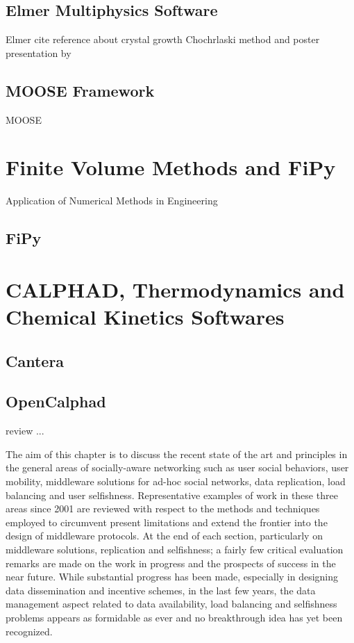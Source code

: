 \subsection{Elmer Multiphysics Software}
Elmer cite reference about crystal growth Chochrlaski method \cite{VSavolainen2002} and poster presentation by 
\cite{PRaback2007}
\subsection{MOOSE Framework}
MOOSE 
\section{Finite Volume Methods and FiPy} 
Application of Numerical Methods in Engineering
\subsection{FiPy}

\section{CALPHAD, Thermodynamics and Chemical Kinetics Softwares}
\subsection{Cantera}
\subsection{OpenCalphad}

review
...

The aim of this chapter is to discuss the recent state of the art and principles in the general areas of socially-aware networking such as user social behaviors, user mobility, middleware solutions for ad-hoc social networks, data replication, load balancing and user selfishness. Representative examples of work in these three areas since 2001 are reviewed with respect to the methods and techniques employed to circumvent present limitations and extend the frontier into the design of middleware protocols. At the end of each section, particularly on middleware solutions, replication and selfishness; a fairly few critical evaluation remarks are made on the work in progress and the prospects of success in the near future. While substantial progress has been made, especially in designing data dissemination and incentive schemes, in the last few years, the data management aspect related to data availability, load balancing and selfishness problems appears as formidable as ever and no breakthrough idea has yet been recognized.

